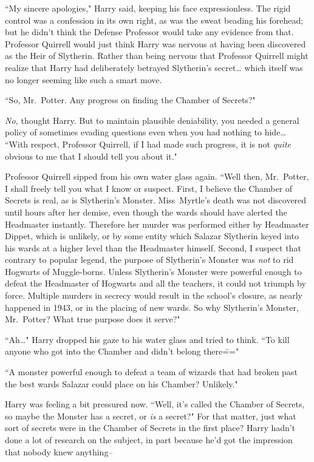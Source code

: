 ``My sincere apologies," Harry said, keeping his face expressionless. The rigid control was a confession in its own right, as was the sweat beading his forehead; but he didn't think the Defense Professor would take any evidence from that. Professor Quirrell would just think Harry was nervous at having been discovered as the Heir of Slytherin. Rather than being nervous that Professor Quirrell might realize that Harry had deliberately betrayed Slytherin's secret{\ldots} which itself was no longer seeming like such a smart move.

``So, Mr.~Potter. Any progress on finding the Chamber of Secrets?"

\emph{No,} thought Harry. But to maintain plausible deniability, you needed a general policy of sometimes evading questions even when you had nothing to hide{\ldots} ``With respect, Professor Quirrell, if I had made such progress, it is not \emph{quite} obvious to me that I should tell you about it."

Professor Quirrell sipped from his own water glass again. ``Well then, Mr.~Potter, I shall freely tell you what I know or suspect. First, I believe the Chamber of Secrets is real, as is Slytherin's Monster. Miss~Myrtle's death was not discovered until hours after her demise, even though the wards should have alerted the Headmaster instantly. Therefore her murder was performed either by Headmaster Dippet, which is unlikely, or by some entity which Salazar Slytherin keyed into his wards at a higher level than the Headmaster himself. Second, I suspect that contrary to popular legend, the purpose of Slytherin's Monster was \emph{not} to rid Hogwarts of Muggle-borns. Unless Slytherin's Monster were powerful enough to defeat the Headmaster of Hogwarts and all the teachers, it could not triumph by force. Multiple murders in secrecy would result in the school's closure, as nearly happened in 1943, or in the placing of new wards. So why Slytherin's Monster, Mr.~Potter? What true purpose does it serve?"

``Ah{\ldots}" Harry dropped his gaze to his water glass and tried to think. ``To kill anyone who got into the Chamber and didn't belong there\==="

``A monster powerful enough to defeat a team of wizards that had broken past the best wards Salazar could place on his Chamber? Unlikely."

Harry was feeling a bit pressured now. ``Well, it's called the Chamber of Secrets, so maybe the Monster has a secret, or \emph{is} a secret?" For that matter, just what sort of secrets were in the Chamber of Secrets in the first place? Harry hadn't done a lot of research on the subject, in part because he'd got the impression that nobody knew anything\---

